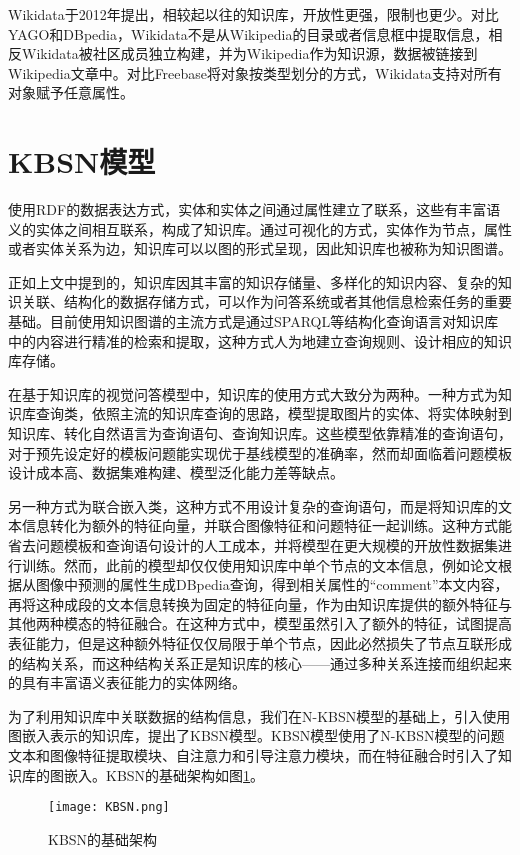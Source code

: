 Wikidata于2012年提出，相较起以往的知识库，开放性更强，限制也更少。对比YAGO和DBpedia，Wikidata不是从Wikipedia的目录或者信息框中提取信息，相反Wikidata被社区成员独立构建，并为Wikipedia作为知识源，数据被链接到Wikipedia文章中。对比Freebase将对象按类型划分的方式，Wikidata支持对所有对象赋予任意属性。

\section{KBSN模型}
使用RDF的数据表达方式，实体和实体之间通过属性建立了联系，这些有丰富语义的实体之间相互联系，构成了知识库。通过可视化的方式，实体作为节点，属性或者实体关系为边，知识库可以以图的形式呈现，因此知识库也被称为知识图谱。

正如上文中提到的，知识库因其丰富的知识存储量、多样化的知识内容、复杂的知识关联、结构化的数据存储方式，可以作为问答系统或者其他信息检索任务的重要基础。目前使用知识图谱的主流方式是通过SPARQL等结构化查询语言对知识库中的内容进行精准的检索和提取，这种方式人为地建立查询规则、设计相应的知识库存储。

在基于知识库的视觉问答模型中，知识库的使用方式大致分为两种。一种方式为知识库查询类，依照主流的知识库查询的思路，模型提取图片的实体、将实体映射到知识库、转化自然语言为查询语句、查询知识库。这些模型依靠精准的查询语句，对于预先设定好的模板问题能实现优于基线模型的准确率，然而却面临着问题模板设计成本高、数据集难构建、模型泛化能力差等缺点。

另一种方式为联合嵌入类，这种方式不用设计复杂的查询语句，而是将知识库的文本信息转化为额外的特征向量，并联合图像特征和问题特征一起训练。这种方式能省去问题模板和查询语句设计的人工成本，并将模型在更大规模的开放性数据集进行训练。然而，此前的模型却仅仅使用知识库中单个节点的文本信息，例如论文根据从图像中预测的属性生成DBpedia查询，得到相关属性的“comment”本文内容，再将这种成段的文本信息转换为固定的特征向量，作为由知识库提供的额外特征与其他两种模态的特征融合。在这种方式中，模型虽然引入了额外的特征，试图提高表征能力，但是这种额外特征仅仅局限于单个节点，因此必然损失了节点互联形成的结构关系，而这种结构关系正是知识库的核心——通过多种关系连接而组织起来的具有丰富语义表征能力的实体网络。

为了利用知识库中关联数据的结构信息，我们在N-KBSN模型的基础上，引入使用图嵌入表示的知识库，提出了KBSN模型。KBSN模型使用了N-KBSN模型的问题文本和图像特征提取模块、自注意力和引导注意力模块，而在特征融合时引入了知识库的图嵌入。KBSN的基础架构如图\ref{KBSN}。
\begin{figure}[H]
	\centering
	\texttt{[image: KBSN.png]}
	\caption{KBSN的基础架构}
	\label{KBSN}
\end{figure}

